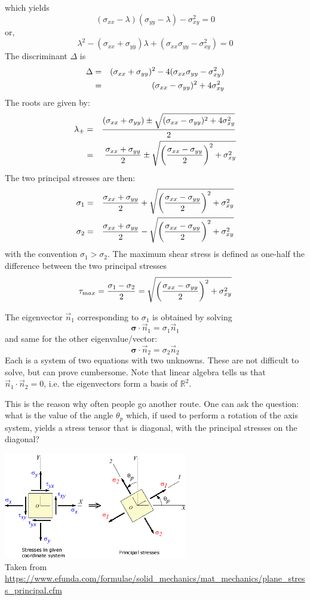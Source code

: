 which yields
\[
(\sigma_{xx}-\lambda)(\sigma_{yy}-\lambda)-\sigma_{xy}^2 =0
\]
or, 
\[
\lambda^2 - (\sigma_{xx}+\sigma_{yy}) \lambda   + (\sigma_{xx}\sigma_{yy}-\sigma_{xy}^2) =0
\]
The discriminant $\Delta$ is 
\begin{eqnarray}
\Delta 
&=& (\sigma_{xx}+\sigma_{yy})^2-4(\sigma_{xx}\sigma_{yy}-\sigma_{xy}^2)  \nonumber\\
&=& (\sigma_{xx}-\sigma_{yy})^2 +4\sigma_{xy}^2  \nonumber
\end{eqnarray}
The roots are given by:
\begin{eqnarray}
\lambda_\pm 
&=& \frac{ (\sigma_{xx}+\sigma_{yy}) \pm \sqrt{ (\sigma_{xx}-\sigma_{yy})^2 +4\sigma_{xy}^2 } }{2} \nonumber\\
&=& \frac{ \sigma_{xx}+\sigma_{yy}}{2} \pm \sqrt{ \left(\frac{\sigma_{xx}-\sigma_{yy}}{2}\right)^2 +\sigma_{xy}^2 } \nonumber
\end{eqnarray}
The two principal stresses are then:
\begin{eqnarray}
\sigma_1 &=& \frac{ \sigma_{xx}+\sigma_{yy}}{2} + \sqrt{ \left(\frac{\sigma_{xx}-\sigma_{yy}}{2}\right)^2 +\sigma_{xy}^2 } \nonumber\\
\sigma_2 &=& \frac{ \sigma_{xx}+\sigma_{yy}}{2} - \sqrt{ \left(\frac{\sigma_{xx}-\sigma_{yy}}{2}\right)^2 +\sigma_{xy}^2 } \nonumber
\end{eqnarray}
with the convention $\sigma_1>\sigma_2$.
The maximum shear stress is defined as one-half the difference between the two principal 
stresses 
\[
\tau_{\text max}=
\frac{\sigma_1-\sigma_2}{2}
=\sqrt{ \left(\frac{\sigma_{xx}-\sigma_{yy}}{2}\right)^2 +\sigma_{xy}^2 } 
\]

The eigenvector $\vec{n}_1$ corresponding to $\sigma_1$ is obtained by solving 
\[
{\bm \sigma}\cdot \vec{n}_1 = \sigma_1 \vec{n}_1
\]
and same for the other eigenvalue/vector:
\[
{\bm \sigma}\cdot \vec{n}_2 = \sigma_2 \vec{n}_2
\]
Each is a system of two equations with two unknowns. These are not difficult to solve, 
but can prove cumbersome. Note that linear algebra tells us that $\vec{n}_1\cdot\vec{n}_2=0$, 
i.e. the eigenvectors form a basis of $\mathbb{R}^2$.

This is the reason why often people go another route. One can ask the question: what is the 
value of the angle $\theta_p$ which, if used to perform a rotation of the axis system, yields 
a stress tensor that is diagonal, with the principal stresses on the diagonal?
 
\begin{center}
\includegraphics[width=8cm]{images/princ_stress/PrincipalStress}\\
{\scriptsize Taken from \url{https://www.efunda.com/formulae/solid_mechanics/mat_mechanics/plane_stress_principal.cfm}}
\end{center}
 
